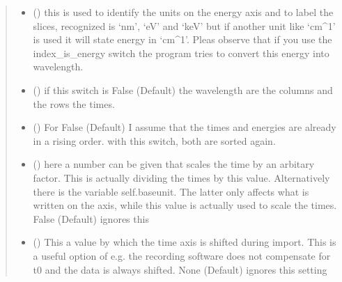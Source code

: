 \documentclass[letterpaper,10pt,english]{sphinxmanual}
\begin{document}
\begin{fulllineitems}
\begin{fulllineitems}
\begin{quote}
\begin{description}
\begin{itemize}
\item {} 
 (\sphinxstyleliteralemphasis{\sphinxupquote{ (}}\sphinxstyleliteralemphasis{\sphinxupquote{)}}) \textendash{} this is used to identify the units on the energy axis and to label the slices, recognized is ‘nm’, ‘eV’ and ‘keV’
but if another unit like ‘cm\textasciicircum{}\sphinxhyphen{}1’ is used it will state energy in ‘cm\textasciicircum{}\sphinxhyphen{}1’. Pleas observe that if you use the index\_is\_energy
switch the program tries to convert this energy into wavelength.

\item {} 
 (\sphinxstyleliteralemphasis{\sphinxupquote{ (}}\sphinxstyleliteralemphasis{\sphinxupquote{)}}) \textendash{} if this switch is False (Default) the wavelength are the columns and the rows the times.

\item {} 
 (\sphinxstyleliteralemphasis{\sphinxupquote{ (}}\sphinxstyleliteralemphasis{\sphinxupquote{)}}) \textendash{} For False (Default) I assume that the times and energies are already in a rising order.
with this switch, both are sorted again.

\item {} 
 (\sphinxstyleliteralemphasis{\sphinxupquote{ (}}\sphinxstyleliteralemphasis{\sphinxupquote{)}}) \textendash{} here a number can be given that scales the time by an arbitary factor. This is actually dividing
the times by this value. Alternatively there is the variable self.baseunit. The latter only affects
what is written on the axis, while this value is actually used to scale the times. False (Default)
ignores this

\item {} 
 (\sphinxstyleliteralemphasis{\sphinxupquote{, }}\sphinxstyleliteralemphasis{\sphinxupquote{ (}}\sphinxstyleliteralemphasis{\sphinxupquote{)}}) \textendash{} This a value by which the time axis is shifted during import. This is a useful option of e.g.
the recording software does not compensate for t0 and the data is always shifted.
None (Default) ignores this setting


\end{itemize}
\end{description}
\end{quote}
\end{fulllineitems}
\end{fulllineitems}
\end{document}
